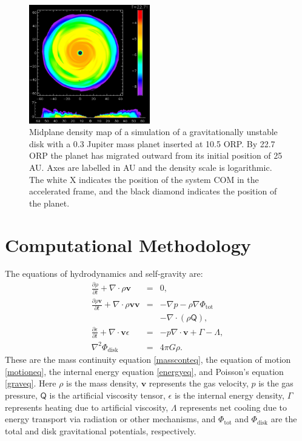 \documentclass[12pt,preprint2]{aastex}
\begin{document}
\begin{figure} [t] %
\includegraphics[width=0.47\textwidth]{0.3JUP.eps}
\caption{Midplane density map of a simulation of a gravitationally unstable disk with a 0.3 Jupiter mass planet inserted
  at 10.5 ORP. By 22.7 ORP the planet has migrated outward from its initial position of 25 AU. Axes are labelled in AU
  and the density scale is logarithmic. The white X indicates the position of the system COM in the accelerated frame,
  and the black diamond indicates the position of the planet. \label{fig:modes}}
\end{figure}

\section{Computational Methodology}
\label{sec:method}

The equations of hydrodynamics and self-gravity are:
\begin{eqnarray}
\frac{\partial \rho}{\partial t} + \nabla \cdot \rho \boldsymbol{v} & = & 0,\label{massconteq}\\
\frac{\partial \rho \boldsymbol{v}}{\partial t} + \nabla \cdot \rho \boldsymbol{vv} & = & -\nabla p - \rho \nabla \Phi_{\mathrm{tot}}\nonumber\\
&& - \nabla \cdot (\rho \mathsf{Q}),\label{motioneq}\\
\frac{\partial \epsilon}{\partial t} + \nabla \cdot \boldsymbol{v} \epsilon & = & - p \nabla \cdot \boldsymbol{v} + \Gamma - \Lambda,\label{energyeq}\\
\nabla^2 \Phi_{\mathrm{disk}} & = & 4 \pi G \rho\label{graveq}.
\end{eqnarray}
These are the mass continuity equation \eqref{massconteq}, the equation of motion \eqref{motioneq}, the internal energy equation \eqref{energyeq}, and Poisson's equation \eqref{graveq}. Here $\rho$ is the mass density, $\mathbf{v}$ represents the gas velocity, $p$ is the gas pressure, $\mathsf{Q}$ is the artificial viscosity tensor, $\epsilon$ is the internal energy density, $\Gamma$ represents heating due to artificial viscosity, $\Lambda$ represents net cooling due to energy transport via radiation or other mechanisms, and $\Phi_{\mathrm{tot}}$ and $\Phi_{\mathrm{disk}}$ are the total and disk gravitational potentials, respectively.
\end{document}
